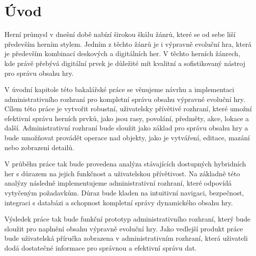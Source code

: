 \chapter{Úvod}
\label{ch:introduction}

Herní průmysl v dnešní době nabízí širokou škálu žánrů, které se od sebe liší především herním stylem. Jedním z těchto žánrů je i výpravně evoluční hra, která je především kombinací deskových a digitálních her. V těchto herních žánrech, kde právě přebývá digitální prvek je důležité mít kvalitní a sofistikovaný nástroj pro správu obsahu hry.

V úvodní kapitole této bakalářské práce se věnujeme návrhu a implementaci administrativního rozhraní pro kompletní správu obsahu výpravné evoluční hry. Cílem této práce je vytvořit robustní, uživatelsky přívětivé rozhraní, které umožní efektivní správu herních prvků, jako jsou rasy, povolání, předměty, akce, lokace a další. Administrativní rozhraní bude sloužit jako základ pro správu obsahu hry a bude umožňovat provádět operace nad objekty, jako je vytváření, editace, mazání nebo zobrazení detailů.

V průběhu práce tak bude provedena analýza stávajících dostupných hybridních her s důrazem na jejich funkčnost a uživatelskou přívětivost. Na základně této analýzy následně implementujeme administrativní rozhraní, které odpovídá vytyčeným požadavkům. Důraz bude kladen na intuitivní navigaci, bezpečnost, integraci s databázi a schopnost kompletní správy dynamického obsahu hry.

Výsledek práce tak bude funkční prototyp administrativního rozhraní, který bude sloužit pro naplnění obsahu výpravně evoluční hry. Jako vedlejší produkt práce bude uživatelská příručka zobrazena v administrativním rozhraní, která uživateli dodá dostatečné informace pro správnou a efektivní správu dat.

\endinput
